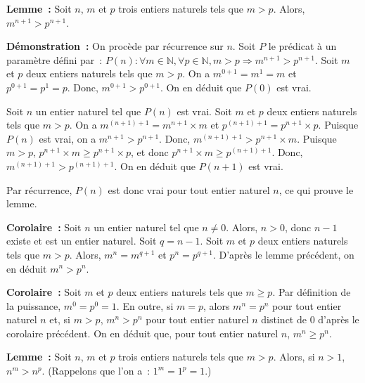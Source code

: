    \done 

\medskip

\noindent\textbf{Lemme :} Soit $n$, $m$ et $p$ trois entiers naturels tels que $m > p$. 
    Alors, $m^{n+1} > p^{n+1}$. 

\medskip

\noindent\textbf{Démonstration :} On procède par récurrence sur $n$. 
    Soit $P$ le prédicat à un paramètre défini par : $P(n): \forall m \in \mathbb{N}, \forall p \in \mathbb{N}, m > p \Rightarrow m^{n+1} > p^{n+1}$. 
    Soit $m$ et $p$ deux entiers naturels tels que $m > p$. 
    On a $m^{0+1} = m^1 = m$ et $p^{0+1} = p^1 = p$. 
    Donc, $m^{0+1} > p^{0+1}$. 
    On en déduit que $P(0)$ est vrai.

    Soit $n$ un entier naturel tel que $P(n)$ est vrai. 
    Soit $m$ et $p$ deux entiers naturels tels que $m > p$. 
    On a $m^{(n+1)+1} = m^{n+1} \times m$ et $p^{(n+1)+1} = p^{n+1} \times p$. 
    Puisque $P(n)$ est vrai, on a $m^{n+1} > p^{n+1}$. 
    Donc, $m^{(n+1)+1} > p^{n+1} \times m$. 
    Puisque $m > p$, $p^{n+1} \times m \geq p^{n+1} \times p$, et donc $p^{n+1} \times m \geq p^{(n+1)+1}$. 
    Donc, $m^{(n+1)+1} > p^{(n+1)+1}$. 
    On en déduit que $P(n+1)$ est vrai. 

    Par récurrence, $P(n)$ est donc vrai pour tout entier naturel $n$, ce qui prouve le lemme.

   \done 

\medskip

\noindent\textbf{Corolaire :} 
    Soit $n$ un entier naturel tel que $n \neq 0$. 
    Alors, $n > 0$, donc $n - 1$ existe et est un entier naturel.
    Soit $q = n - 1$. 
    Soit $m$ et $p$ deux entiers naturels tels que $m > p$.
    Alors, $m^n = m^{q+1}$ et $p^n = p^{q+1}$. 
    D'après le lemme précédent, on en déduit $m^n > p^n$. 

\medskip

\noindent\textbf{Corolaire :} 
    Soit $m$ et $p$ deux entiers naturels tels que $m \geq p$.
    Par définition de la puissance, $m^0 = p^0 = 1$.
    En outre, si $m = p$, alors $m^n = p^n$ pour tout entier naturel $n$ et, si $m > p$, $m^n > p^n$ pour tout entier naturel $n$ distinct de $0$ d'après le corolaire précédent.
    On en déduit que, pour tout entier naturel $n$, $m^n \geq p^n$.

\medskip

\noindent\textbf{Lemme :} Soit $n$, $m$ et $p$ trois entiers naturels tels que $m > p$. 
    Alors, si $n > 1$, $n^m > n^p$. 
    (Rappelons que l'on a : $1^m = 1^p = 1$.)

